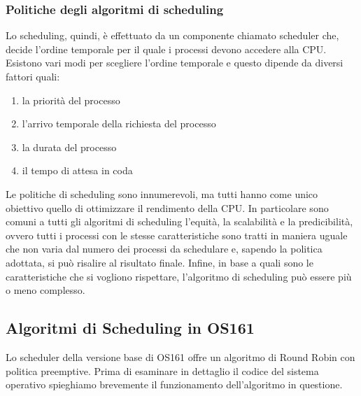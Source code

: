 \subsubsection{Politiche degli algoritmi di scheduling}
Lo scheduling, quindi, è effettuato da un componente chiamato scheduler che, decide l'ordine temporale per il quale i processi devono accedere alla CPU. Esistono vari modi per scegliere l'ordine temporale e questo dipende da diversi fattori quali:
\begin{enumerate}
    \item la priorità del processo
    \item l'arrivo temporale della richiesta del processo
    \item la durata del processo
    \item il tempo di attesa in coda
\end{enumerate}
Le politiche di scheduling sono innumerevoli, ma tutti hanno come unico obiettivo quello di ottimizzare il rendimento della CPU. In particolare sono comuni a tutti gli algoritmi di scheduling l'equità, la scalabilità e la predicibilità, ovvero tutti i processi con le stesse caratteristiche sono tratti in maniera uguale che non varia dal numero dei processi da schedulare e, sapendo la politica adottata, si può risalire al risultato finale. Infine, in base a quali sono le caratteristiche che si vogliono rispettare, l'algoritmo di scheduling può essere più o meno complesso.
\subsection{Algoritmi di Scheduling in OS161}
Lo scheduler della versione base di OS161 offre un algoritmo di Round Robin con politica preemptive. Prima di esaminare in dettaglio il codice del sistema operativo spieghiamo brevemente il funzionamento dell'algoritmo in questione.
